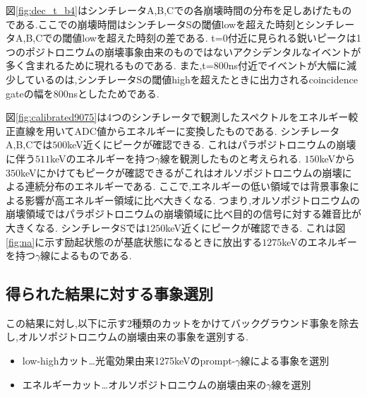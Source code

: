 図\ref{fig:dec_t_b4}はシンチレータA,B,Cでの各崩壊時間の分布を足しあげたものである.ここでの崩壊時間はシンチレータSの閾値lowを超えた時刻とシンチレータA,B,Cでの閾値lowを超えた時刻の差である.
t=0付近に見られる鋭いピークは1つのポジトロニウムの崩壊事象由来のものではないアクシデンタルなイベントが多く含まれるために現れるものである.
また,t=800ns付近でイベントが大幅に減少しているのは,シンチレータSの閾値highを超えたときに出力されるcoincidence gateの幅を800nsとしたためである.

図\ref{fig:calibrated9075}は4つのシンチレータで観測したスペクトルをエネルギー較正直線を用いてADC値からエネルギーに変換したものである.
シンチレータA,B,Cでは$500$keV近くにピークが確認できる.
これはパラポジトロニウムの崩壊に伴う$511$keVのエネルギーを持つ$\gamma$線を観測したものと考えられる.
$150$keVから$350$keVにかけてもピークが確認できるがこれはオルソポジトロニウムの崩壊による連続分布のエネルギーである.
ここで,エネルギーの低い領域では背景事象による影響が高エネルギー領域に比べ大きくなる.
つまり,オルソポジトロニウムの崩壊領域ではパラポジトロニウムの崩壊領域に比べ目的の信号に対する雑音比が大きくなる.
シンチレータSでは$1250$keV近くにピークが確認できる.
これは図\ref{fig:na}に示す励起状態のが基底状態になるときに放出する$1275$keVのエネルギーを持つ$\gamma$線によるものである.

\subsection{得られた結果に対する事象選別}
この結果に対し,以下に示す2種類のカットをかけてバックグラウンド事象を除去し,オルソポジトロニウムの崩壊由来の事象を選別する.
\begin{itemize}
	\item low-highカット…光電効果由来1275keVのprompt-$\gamma$線による事象を選別
	\item エネルギーカット…オルソポジトロニウムの崩壊由来の$\gamma$線を選別
\end{itemize}

